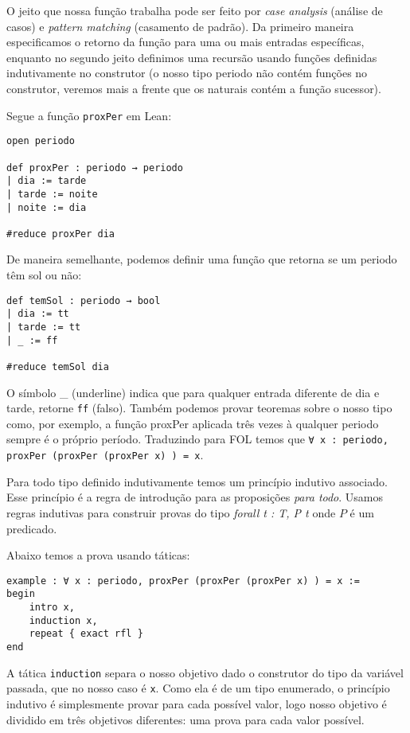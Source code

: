 O jeito que nossa função trabalha pode ser feito por \textit{case analysis} (análise de casos) e \textit{pattern matching} (casamento de padrão). Da primeiro maneira especificamos o retorno da função para uma ou mais entradas específicas, enquanto no segundo jeito definimos uma recursão usando funções definidas indutivamente no construtor (o nosso tipo periodo não contém funções no construtor, veremos mais a frente que os naturais contém a função sucessor).

Segue a função \lstinline{proxPer} em Lean:

\begin{lstlisting}
open periodo

def proxPer : periodo → periodo
| dia := tarde
| tarde := noite
| noite := dia

#reduce proxPer dia
\end{lstlisting}

De maneira semelhante, podemos definir uma função que retorna se um periodo têm sol ou não:

\begin{lstlisting}
def temSol : periodo → bool
| dia := tt
| tarde := tt
| _ := ff

#reduce temSol dia
\end{lstlisting}

O símbolo \_ (underline) indica que para qualquer entrada diferente de dia e tarde, retorne \lstinline{ff} (falso). Também podemos provar teoremas sobre o nosso tipo como, por exemplo, a função proxPer aplicada três vezes à qualquer periodo sempre é o próprio período. Traduzindo para FOL temos que \lstinline{∀ x : periodo, proxPer (proxPer (proxPer x) ) = x}. 

Para todo tipo definido indutivamente temos um princípio indutivo associado. Esse princípio é a regra de introdução para as proposições \textit{para todo}. Usamos regras indutivas para construir provas do tipo \textit{forall t : T, P t} onde $P$ é um predicado.

Abaixo temos a prova usando táticas:

\begin{lstlisting}
example : ∀ x : periodo, proxPer (proxPer (proxPer x) ) = x :=
begin
    intro x,
    induction x,
    repeat { exact rfl }
end
\end{lstlisting}

A tática \lstinline{induction} separa o nosso objetivo dado o construtor do tipo da variável passada, que no nosso caso é \lstinline{x}. Como ela é de um tipo enumerado, o princípio indutivo é simplesmente provar para cada possível valor, logo nosso objetivo é dividido em três objetivos diferentes: uma prova para cada valor possível.

